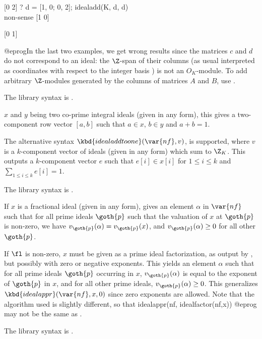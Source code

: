   [0 2]
  ? d = [1, 0; 0, 2]; idealadd(K, d, d)   \\ non-sense
  [1 0]

  [0 1]

@eprog\noindent In the last two examples, we get wrong results since the
matrices $c$ and $d$ do not correspond to an ideal: the $\Z$-span of their
columns (as usual interpreted as coordinates with respect to the integer basis
) is not an $O_K$-module. To add arbitrary $\Z$-modules generated
by the columns of matrices $A$ and $B$, use .

The library syntax is .

\label{se:idealaddtoone}
$x$ and $y$ being two co-prime
integral ideals (given in any form), this gives a two-component row vector
$[a,b]$ such that $a\in x$, $b\in y$ and $a+b=1$.

The alternative syntax $\kbd{idealaddtoone}(\var{nf},v)$, is supported, where
$v$ is a $k$-component vector of ideals (given in any form) which sum to
$\Z_K$. This outputs a $k$-component vector $e$ such that $e[i]\in x[i]$ for
$1\le i\le k$ and $\sum_{1\le i\le k}e[i]=1$.

The library syntax is .

\label{se:idealappr}
If $x$ is a fractional ideal
(given in any form), gives an element $\alpha$ in $\var{nf}$ such that for
all prime ideals $\goth{p}$ such that the valuation of $x$ at $\goth{p}$ is
non-zero, we have $v_{\goth{p}}(\alpha)=v_{\goth{p}}(x)$, and
$v_{\goth{p}}(\alpha)\ge0$ for all other $\goth{p}$.

If $\fl$ is non-zero, $x$ must be given as a prime ideal factorization, as
output by , but possibly with zero or negative exponents.
This yields an element $\alpha$ such that for all prime ideals $\goth{p}$
occurring in $x$, $v_{\goth{p}}(\alpha)$ is equal to the exponent of
$\goth{p}$ in $x$, and for all other prime ideals,
$v_{\goth{p}}(\alpha)\ge0$. This generalizes $\kbd{idealappr}(\var{nf},x,0)$
since zero exponents are allowed. Note that the algorithm used is slightly
different, so that
\bprog
  idealappr(nf, idealfactor(nf,x))
@eprog\noindent
may not be the same as .

The library syntax is .

